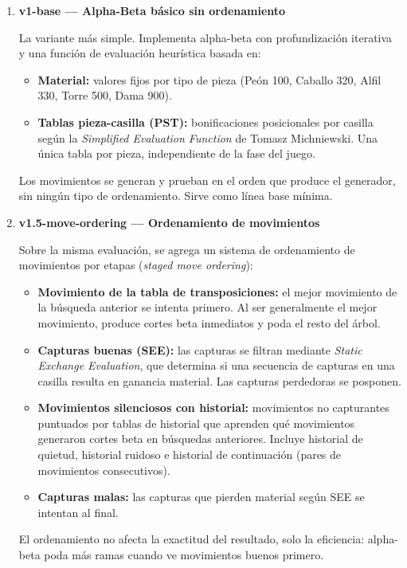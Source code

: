 \documentclass[12pt]{article}
\begin{document}
\begin{enumerate}[label=\textbf{\arabic*.}]

    \item \textbf{v1-base --- Alpha-Beta básico sin ordenamiento}

    La variante más simple. Implementa alpha-beta con profundización iterativa y una función de evaluación heurística basada en:
    \begin{itemize}
        \item \textbf{Material:} valores fijos por tipo de pieza (Peón 100, Caballo 320, Alfil 330, Torre 500, Dama 900).
        \item \textbf{Tablas pieza-casilla (PST):} bonificaciones posicionales por casilla según la \textit{Simplified Evaluation Function} de Tomasz Michniewski. Una única tabla por pieza, independiente de la fase del juego.
    \end{itemize}
    Los movimientos se generan y prueban en el orden que produce el generador, sin ningún tipo de ordenamiento. Sirve como línea base mínima.

    \item \textbf{v1.5-move-ordering --- Ordenamiento de movimientos}

    Sobre la misma evaluación, se agrega un sistema de ordenamiento de movimientos por etapas (\textit{staged move ordering}):
    \begin{itemize}
        \item \textbf{Movimiento de la tabla de transposiciones:} el mejor movimiento de la búsqueda anterior se intenta primero. Al ser generalmente el mejor movimiento, produce cortes beta inmediatos y poda el resto del árbol.
        \item \textbf{Capturas buenas (SEE):} las capturas se filtran mediante \textit{Static Exchange Evaluation}, que determina si una secuencia de capturas en una casilla resulta en ganancia material. Las capturas perdedoras se posponen.
        \item \textbf{Movimientos silenciosos con historial:} movimientos no capturantes puntuados por tablas de historial que aprenden qué movimientos generaron cortes beta en búsquedas anteriores. Incluye historial de quietud, historial ruidoso e historial de continuación (pares de movimientos consecutivos).
        \item \textbf{Capturas malas:} las capturas que pierden material según SEE se intentan al final.
    \end{itemize}
    El ordenamiento no afecta la exactitud del resultado, solo la eficiencia: alpha-beta poda más ramas cuando ve movimientos buenos primero.


\end{enumerate}
\end{document}
